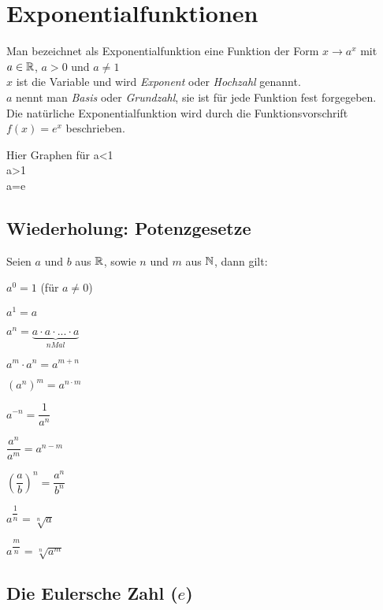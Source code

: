 \chapter{Exponentialfunktionen}

\begin{Definition}
Man bezeichnet als Exponentialfunktion eine Funktion der Form $x\rightarrow a^x$ mit $a\in \mathbb{R}$, $a>0$ und $a\neq1$\\
$x$ ist die Variable und wird \textit{Exponent} oder \textit{Hochzahl} genannt.\\
$a$ nennt man \textit{Basis} oder \textit{Grundzahl}, sie ist für jede Funktion fest forgegeben.\\
Die natürliche Exponentialfunktion wird durch die Funktionsvorschrift $f(x)=e^x$ beschrieben.
\end{Definition}

Hier Graphen für a<1\\
a>1\\
a=e\\


		\section{Wiederholung: Potenzgesetze}
Seien $a$ und $b$ aus $\mathbb{R}$, sowie $n$ und $m$ aus $\mathbb{N}$, dann gilt:
\begin{enumerate}
\begin{minipage}{0.5\textwidth}
\item$a^0=1$ (für $a\neq 0$)
\item$a^1=a$
\item$a^n=\underbrace{a\cdot a\cdot ... \cdot a}_{n Mal}$
\item$a^m\cdot a^n=a^{m+n}$
\item$(a^n)^m=a^{n\cdot m}$
\end {minipage}
\begin{minipage}{0.5\textwidth}
\item$a^{-n}=\dfrac{1}{a^n}$
\item$\dfrac{a^n}{a^m}=a^{n-m}$
\item$(\dfrac{a}{b})^n=\dfrac{a^n}{b^n}$
\item $a^{\dfrac{1}{n}}=\sqrt[n]{a}$
\item$a^{\dfrac{m}{n}}=\sqrt[n]{a^m}$
\end {minipage}
\end{enumerate}

		\section{Die Eulersche Zahl ($e$)}

